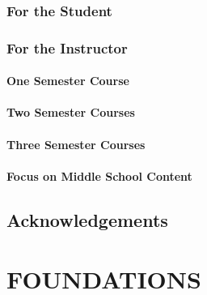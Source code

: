 \documentclass[
]{book}
\theoremstyle{definition}
\theoremstyle{definition}
\theoremstyle{definition}
\theoremstyle{remark}
\begin{document}
\hypertarget{for-the-student}{%
\section*{For the Student}\label{for-the-student}}

\hypertarget{for-the-instructor}{%
\section*{For the Instructor}\label{for-the-instructor}}

\hypertarget{one-semester-course}{%
\subsection*{One Semester Course}\label{one-semester-course}}

\hypertarget{two-semester-courses}{%
\subsection*{Two Semester Courses}\label{two-semester-courses}}

\hypertarget{three-semester-courses}{%
\subsection*{Three Semester Courses}\label{three-semester-courses}}

\hypertarget{focus-on-middle-school-content}{%
\subsection*{Focus on Middle School Content}\label{focus-on-middle-school-content}}

\hypertarget{acknowledgements}{%
\chapter*{Acknowledgements}\label{acknowledgements}}

\hypertarget{part-foundations}{%
\part{FOUNDATIONS}\label{part-foundations}}
\end{document}
